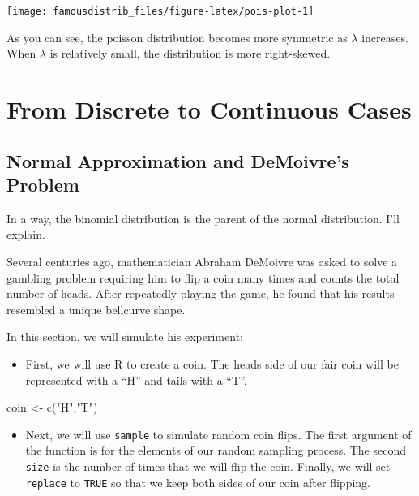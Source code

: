 \documentclass[
]{article}
\newenvironment{Shaded}{\begin{snugshade}}{\end{snugshade}}
\newcommand{\FunctionTok}[1]{\textcolor[rgb]{0.00,0.00,0.00}{#1}}
\newcommand{\NormalTok}[1]{#1}
\newcommand{\OtherTok}[1]{\textcolor[rgb]{0.56,0.35,0.01}{#1}}
\newcommand{\StringTok}[1]{\textcolor[rgb]{0.31,0.60,0.02}{#1}}
\providecommand{\tightlist}{%
  \setlength{\itemsep}{0pt}\setlength{\parskip}{0pt}}
\begin{document}
\begin{center}\texttt{[image: famousdistrib\_files/figure-latex/pois-plot-1]} \end{center}

As you can see, the poisson distribution becomes more symmetric as \(\lambda\) increases. When \(\lambda\) is relatively small, the distribution is more right-skewed.

\hypertarget{DiscreteContinuous}{%
\section{From Discrete to Continuous Cases}\label{DiscreteContinuous}}

\hypertarget{normal-approximation-and-demoivres-problem}{%
\subsection{Normal Approximation and DeMoivre's Problem}\label{normal-approximation-and-demoivres-problem}}

In a way, the binomial distribution is the parent of the normal distribution. I'll explain.

Several centuries ago, mathematician Abraham DeMoivre was asked to solve a gambling problem requiring him to flip a coin many times and counts the total number of heads. After repeatedly playing the game, he found that his results resembled a unique bellcurve shape.

In this section, we will simulate his experiment:

\begin{itemize}
\tightlist
\item
  First, we will use R to create a coin. The heads side of our fair coin will be represented with a ``H'' and tails with a ``T''.
\end{itemize}

\begin{Shaded}
\begin{Highlighting}[]
\NormalTok{coin }\OtherTok{\textless{}{-}} \FunctionTok{c}\NormalTok{(}\StringTok{"H"}\NormalTok{,}\StringTok{"T"}\NormalTok{)}
\end{Highlighting}
\end{Shaded}

\begin{itemize}
\tightlist
\item
  Next, we will use \texttt{sample} to simulate random coin flips. The first argument of the function is for the elements of our random sampling process. The second \texttt{size} is the number of times that we will flip the coin. Finally, we will set \texttt{replace} to \texttt{TRUE} so that we keep both sides of our coin after flipping.
\end{itemize}
\end{document}
